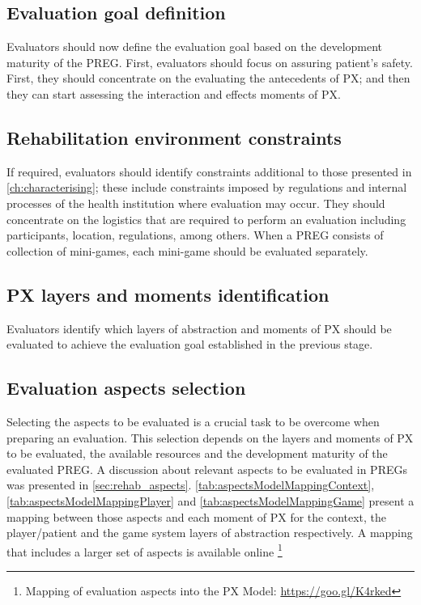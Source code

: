 \subsection{Evaluation goal definition}
Evaluators should now define the evaluation goal based on the development maturity of the \ac{PREG}. First, evaluators should focus on assuring patient’s safety. First, they should concentrate on the evaluating the antecedents of \ac{PX}; and then they can start assessing the interaction and effects moments of \ac{PX}.

\subsection{Rehabilitation environment constraints}
If required, evaluators should identify constraints additional to those presented in \autoref{ch:characterising}; these include constraints imposed by regulations and internal processes of the health institution where evaluation may occur. They should concentrate on the logistics that are required to perform an evaluation including participants, location, regulations, among others. When a \ac{PREG} consists of collection of mini-games, each mini-game should be evaluated separately.

\subsection{\ac{PX} layers and moments identification}
Evaluators identify which layers of abstraction and moments of \ac{PX} should be evaluated to achieve the evaluation goal established in the previous stage.

\subsection{Evaluation aspects selection}
Selecting the aspects to be evaluated is a crucial task to be overcome when preparing an evaluation. This selection depends on the layers and moments of \ac{PX} to be evaluated, the available resources and the development maturity of the evaluated \ac{PREG}. A discussion about relevant aspects to be evaluated in \acp{PREG} was presented in \autoref{sec:rehab_aspects}. \autoref{tab:aspectsModelMappingContext}, \autoref{tab:aspectsModelMappingPlayer} and \autoref{tab:aspectsModelMappingGame} present a mapping between those aspects and each moment of \ac{PX} for the context, the player/patient and the game system layers of abstraction respectively. A mapping that includes a larger set of aspects is available online \footnote{Mapping of evaluation aspects into the PX Model: \url{https://goo.gl/K4rked}}

